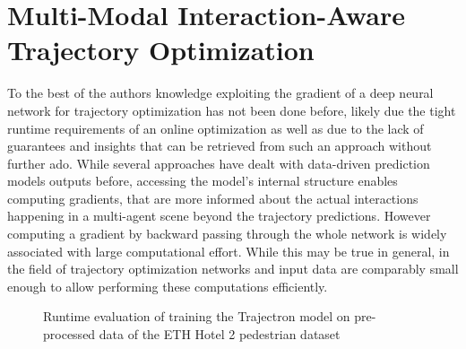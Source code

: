 \chapter{Multi-Modal Interaction-Aware Trajectory Optimization}
\label{text:approach}

To the best of the authors knowledge exploiting the gradient of a deep neural network for trajectory optimization has not been done before, likely due the tight runtime requirements of an online optimization as well as due to the lack of guarantees and insights that can be retrieved from such an approach without further ado. While several approaches have dealt with data-driven prediction models outputs before, accessing the model's internal structure enables computing gradients, that are more informed about the actual interactions happening in a multi-agent scene beyond the trajectory predictions. However computing a gradient by backward passing through the whole network is widely associated with large computational effort. While this may be true in general, in the field of trajectory optimization networks and input data are comparably small enough to allow performing these computations efficiently. 

\begin{figure}[!ht]
\begin{center}
\end{center}
\caption{Runtime evaluation of training the Trajectron model \cite{Salzmann2020} on pre-processed data of the ETH Hotel 2 pedestrian dataset \cite{Pellegrini2009}}
\label{img:training_runtime}
\end{figure}

